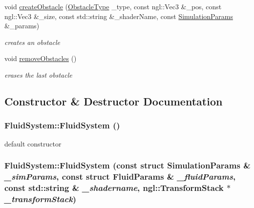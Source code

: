 \begin{DoxyCompactItemize}
void \hyperlink{classFluidSystem_a6e6cf643c1a801897ddb18b1581bc882}{createObstacle} (\hyperlink{Common_8h_a9852a22595ceae4debd70f078e037971}{ObstacleType} \_\-type, const ngl::Vec3 \&\_\-pos, const ngl::Vec3 \&\_\-size, const std::string \&\_\-shaderName, const \hyperlink{structSimulationParams}{SimulationParams} \&\_\-params)
\begin{DoxyCompactList}\small\item\em creates an obstacle \item\end{DoxyCompactList}\item 
void \hyperlink{classFluidSystem_af1f59f82a964eacdb1c3618f804fa7a3}{removeObstacles} ()
\begin{DoxyCompactList}\small\item\em erases the last obstacle \item\end{DoxyCompactList}\end{DoxyCompactItemize}


\subsection{Constructor \& Destructor Documentation}
\hypertarget{classFluidSystem_a026c527ec418ae285285ffb2b877d1dc}{
\subsubsection[{FluidSystem}]{\setlength{\rightskip}{0pt plus 5cm}FluidSystem::FluidSystem ()}}
\label{classFluidSystem_a026c527ec418ae285285ffb2b877d1dc}


default constructor \hypertarget{classFluidSystem_aad830c205f0647117beebc80f8c14969}{
\subsubsection[{FluidSystem}]{\setlength{\rightskip}{0pt plus 5cm}FluidSystem::FluidSystem (const struct {\bf SimulationParams} \& {\em \_\-simParams}, \/  const struct {\bf FluidParams} \& {\em \_\-fluidParams}, \/  const std::string \& {\em \_\-shadername}, \/  ngl::TransformStack $\ast$ {\em \_\-transformStack})}}
\label{classFluidSystem_aad830c205f0647117beebc80f8c14969}


